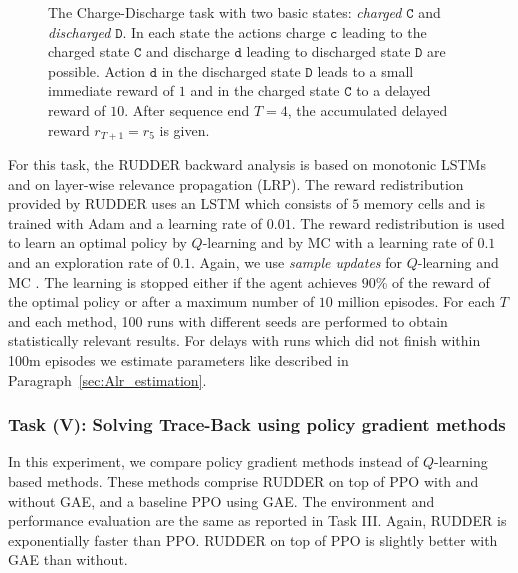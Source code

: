 \documentclass{article}
\begin{document}
\begin{appendices}
\begin{figure}[htp]
{ }
\caption{The Charge-Discharge task with two basic states: {\em charged} $\mathtt{C}$ and 
 {\em discharged} $\mathtt{D}$.
 In each state the actions charge $\mathtt{c}$ leading to 
 the charged state $\mathtt{C}$ 
 and discharge $\mathtt{d}$ leading to discharged state $\mathtt{D}$ are possible. 
 Action $\mathtt{d}$ in the discharged state $\mathtt{D}$ leads to a small immediate reward of $1$ and in the charged state $\mathtt{C}$ 
 to a delayed reward of $10$. 
 After sequence end $T=4$, the accumulated delayed reward $r_{T+1}=r_5$ is given. \label{fig:charge}}
\end{figure}


For this task, 
the RUDDER backward analysis is based on 
monotonic LSTMs
and on layer-wise relevance propagation (LRP). 
The reward redistribution provided by RUDDER uses an 
LSTM which consists of $5$ memory cells 
and is trained with Adam and a learning rate of $0.01$. 
The reward redistribution is used to learn an optimal policy by $Q$-learning and by MC
with a learning rate of $0.1$ and an exploration rate of $0.1$. 
Again, we use {\em sample updates} for $Q$-learning and MC \cite{Sutton:18book}.
The learning is stopped either if the agent achieves $90$\% of the reward of the optimal policy or after a maximum number of $10$ million episodes. 
For each $T$ and each method, 100 runs with different seeds are performed to obtain statistically relevant results. For delays with runs which did not finish within 100m episodes we estimate parameters like described in Paragraph~\ref{sec:Alr_estimation}. 


\subsubsection{Task (V): Solving Trace-Back using policy gradient methods}
In this experiment, we compare policy gradient methods instead of $Q$-learning based methods. 
These methods comprise RUDDER on top of PPO with and without GAE, and a baseline PPO using GAE.
The environment and performance evaluation are the same as reported in Task III.
Again, RUDDER is exponentially faster than PPO. RUDDER on top of PPO is slightly better with GAE than without.


\end{appendices}
\end{document}
